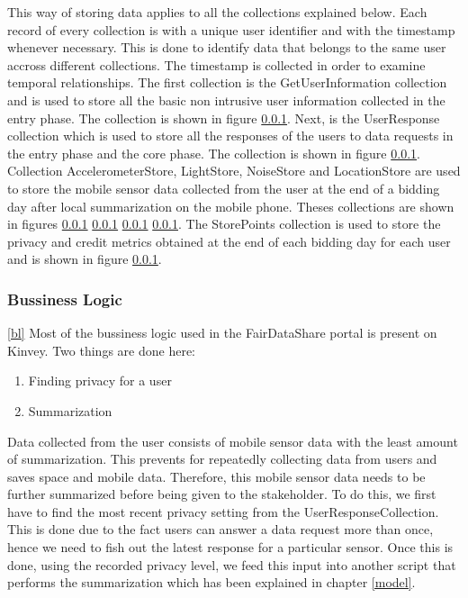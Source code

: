 This way of storing data applies to all the collections explained below. Each record of every collection is with a unique user identifier and with the timestamp whenever necessary. This is done to identify data that belongs to the same user accross different collections. The timestamp
is collected in order to examine temporal relationships.
The first collection is the GetUserInformation collection and is used to store all the basic non intrusive user information 
collected in the entry phase. The collection is shown in figure \ref{}. Next, is the UserResponse collection which is used to store all
the responses of the users to data requests in the entry phase and the core phase. The collection is shown in figure \ref{}. Collection AccelerometerStore, LightStore, NoiseStore and LocationStore are used to store the mobile sensor data collected from the user at the end of a bidding day after local summarization on the mobile phone. Theses collections are shown in figures \ref{} \ref{} \ref{} \ref{}. The StorePoints collection is used to store the privacy and credit metrics obtained at the end of each bidding day  for each user and is shown in figure \ref{}.

\subsubsection{Bussiness Logic} \ref{bl}
Most of the bussiness logic used in the FairDataShare portal is present on Kinvey. Two things are done here:
\begin{enumerate}
    \item Finding privacy for a user
    \item Summarization
\end{enumerate}
Data collected from the user consists of mobile sensor data with the least amount of summarization. This prevents for repeatedly
collecting data from users and saves space and mobile data. Therefore, this mobile sensor data needs to be further summarized before being given to the stakeholder. To do this, we first have to find the most recent privacy setting from the UserResponseCollection. This is done due to the fact users can answer a data request more than once, hence we need to fish out the latest response for a particular sensor. Once this is done, using the recorded privacy level, we feed this input into another script that performs the summarization which has been explained in chapter \ref{model}.

